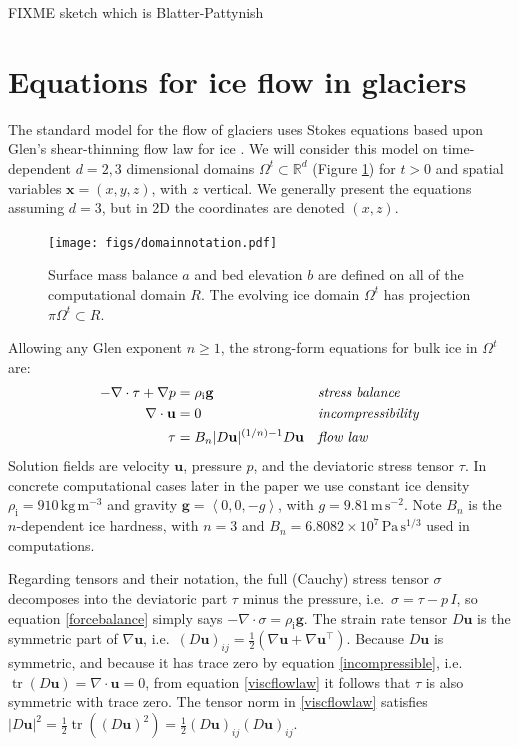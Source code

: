 \documentclass[letterpaper,final,12pt,reqno]{amsart}
\newcommand{\RR}{\mathbb{R}}
\newcommand{\grad}{\nabla}
\newcommand{\Div}{\nabla\cdot}
\newcommand{\trace}{\operatorname{tr}}
\newcommand{\bg}{\mathbf{g}}
\newcommand{\bu}{\mathbf{u}}
\newcommand{\bx}{\mathbf{x}}
\newcommand{\rhoi}{\rho_{\text{i}}}
\begin{document}
FIXME sketch \cite{Brinkerhoffetal2017} which is Blatter-Pattynish


\section{Equations for ice flow in glaciers} \label{sec:strongform}

The standard model for the flow of glaciers uses Stokes equations based upon Glen's shear-thinning flow law for ice \cite{GreveBlatter2009,JouvetRappaz2011,SchoofHewitt2013}.  We will consider this model on time-dependent $d=2,3$ dimensional domains $\Omega^t \subset \RR^d$ (Figure \ref{fig:domainnotation}) for $t>0$ and spatial variables $\bx=(x,y,z)$, with $z$ vertical.  We generally present the equations assuming $d=3$, but in 2D the coordinates are denoted $(x,z)$.

\begin{figure}[ht]
\begin{center}
\texttt{[image: figs/domainnotation.pdf]}
\end{center}
\caption{Surface mass balance $a$ and bed elevation $b$ are defined on all of the computational domain $R$.  The evolving ice domain $\Omega^t$ has projection $\pi \Omega^t \subset R$.}
\label{fig:domainnotation}
\end{figure}

Allowing any Glen exponent $n\ge 1$, the strong-form equations for bulk ice in $\Omega^t$ are:
\begin{align}
- \nabla \cdot \tau + \nabla p &= \rhoi \bg &&\text{\emph{stress balance}} \label{forcebalance} \\
\nabla \cdot \bu &= 0 &&\text{\emph{incompressibility}} \label{incompressible} \\
\tau &= B_n |D\bu|^{(1/n) - 1} D\bu  &&\text{\emph{flow law}} \label{viscflowlaw}
\end{align}
Solution fields are velocity $\bu$, pressure $p$, and the deviatoric stress tensor $\tau$.  In concrete computational cases later in the paper we use constant ice density $\rhoi=910 \,\text{kg}\,\text{m}^{-3}$ and gravity $\bg=\left<0,0,-g\right>$, with $g=9.81\,\text{m}\,\text{s}^{-2}$.  Note $B_n$ is the $n$-dependent ice hardness, with $n=3$ and $B_n=6.8082\times 10^7\,\text{Pa}\,\text{s}^{1/3}$ \cite{Bueleretal2005} used in computations.

Regarding tensors and their notation, the full (Cauchy) stress tensor $\sigma$ \cite{GreveBlatter2009} decomposes into the deviatoric part $\tau$ minus the pressure, i.e.~$\sigma = \tau - p\,I$, so equation \eqref{forcebalance} simply says $-\Div \sigma = \rhoi \bg$.  The strain rate tensor $D\bu$ is the symmetric part of $\grad \bu$, i.e.~$(D\bu)_{ij} = \frac{1}{2} \left(\grad\bu + \grad\bu^\top\right)$.  Because $D\bu$ is symmetric, and because it has trace zero by equation \eqref{incompressible}, i.e.~$\trace(D\bu)=\nabla \cdot \bu = 0$, from equation \eqref{viscflowlaw} it follows that $\tau$ is also symmetric with trace zero.  The tensor norm in \eqref{viscflowlaw} satisfies $|D\bu|^2 = \frac{1}{2} \trace\left((D\bu)^2\right) = \frac{1}{2} (D\bu)_{ij} (D\bu)_{ij}$.
\end{document}
